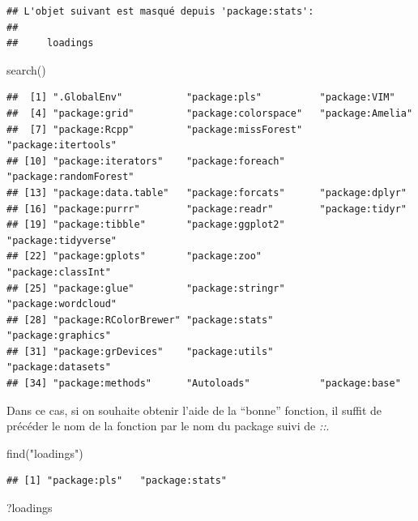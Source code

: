 \documentclass[
]{book}
\newenvironment{Shaded}{\begin{snugshade}}{\end{snugshade}}
\newcommand{\FunctionTok}[1]{\textcolor[rgb]{0.00,0.00,0.00}{#1}}
\newcommand{\NormalTok}[1]{#1}
\newcommand{\StringTok}[1]{\textcolor[rgb]{0.31,0.60,0.02}{#1}}
\theoremstyle{definition}
\theoremstyle{definition}
\theoremstyle{definition}
\theoremstyle{definition}
\theoremstyle{remark}
\begin{document}
\begin{verbatim}
## L'objet suivant est masqué depuis 'package:stats':
## 
##     loadings
\end{verbatim}

\begin{Shaded}
\begin{Highlighting}[]
\FunctionTok{search}\NormalTok{()}
\end{Highlighting}
\end{Shaded}

\begin{verbatim}
##  [1] ".GlobalEnv"           "package:pls"          "package:VIM"         
##  [4] "package:grid"         "package:colorspace"   "package:Amelia"      
##  [7] "package:Rcpp"         "package:missForest"   "package:itertools"   
## [10] "package:iterators"    "package:foreach"      "package:randomForest"
## [13] "package:data.table"   "package:forcats"      "package:dplyr"       
## [16] "package:purrr"        "package:readr"        "package:tidyr"       
## [19] "package:tibble"       "package:ggplot2"      "package:tidyverse"   
## [22] "package:gplots"       "package:zoo"          "package:classInt"    
## [25] "package:glue"         "package:stringr"      "package:wordcloud"   
## [28] "package:RColorBrewer" "package:stats"        "package:graphics"    
## [31] "package:grDevices"    "package:utils"        "package:datasets"    
## [34] "package:methods"      "Autoloads"            "package:base"
\end{verbatim}

Dans ce cas, si on souhaite obtenir l'aide de la ``bonne'' fonction, il suffit de précéder le nom de la fonction par le nom du package suivi de \emph{::}.

\begin{Shaded}
\begin{Highlighting}[]
\FunctionTok{find}\NormalTok{(}\StringTok{"loadings"}\NormalTok{)}
\end{Highlighting}
\end{Shaded}

\begin{verbatim}
## [1] "package:pls"   "package:stats"
\end{verbatim}

\begin{Shaded}
\begin{Highlighting}[]
\NormalTok{?loadings}
\end{Highlighting}
\end{Shaded}
\end{document}
